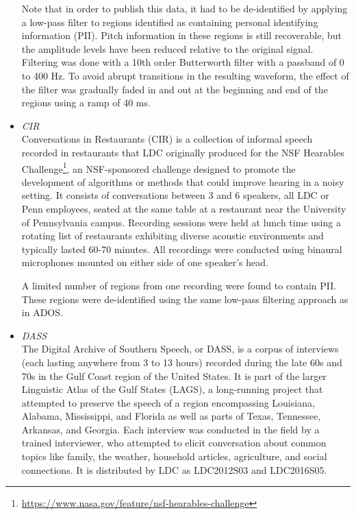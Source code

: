 \documentclass{article}
\begin{document}
\begin{appendices}
\begin{itemize}
            Note that in order to publish this data, it had to be de-identified by applying a low-pass filter to regions identified as containing personal identifying information (PII). Pitch information in these regions is still recoverable, but the amplitude levels have been reduced relative to the original signal. Filtering was done with a 10th order Butterworth filter with a passband of 0 to 400 Hz. To avoid abrupt transitions in the resulting waveform, the effect of the filter was gradually faded in and out at the beginning and end of the regions using a ramp of 40 ms.
        \item {\it CIR} \\
            Conversations in Restaurants (CIR) is a collection of informal speech recorded in restaurants that LDC originally produced for the NSF Hearables Challenge\footnote{\url{https://www.nasa.gov/feature/nsf-hearables-challenge}}, an NSF-sponsored challenge designed to promote the development of algorithms or methods that could improve hearing in a noisy setting. It consists of conversations between 3 and 6 speakers, all LDC or Penn employees, seated at the same table at a restaurant near the University of Pennsylvania campus. Recording sessions were held at lunch time using a rotating list of restaurants exhibiting diverse acoustic environments and typically lasted 60-70 minutes. All recordings were conducted using binaural microphones mounted on either side of one speaker's head. 
        
            A limited number of regions from one recording were found to contain PII. These regions were de-identified using the same low-pass filtering approach as in ADOS.
        \item {\it DASS} \\
            The Digital Archive of Southern Speech, or DASS, is a corpus of interviews (each lasting anywhere from 3 to 13 hours) recorded during the late 60s and 70s in the Gulf Coast region of the United States. It is part of the larger Linguistic Atlas of the Gulf States (LAGS), a long-running project that attempted to preserve the speech of a region encompassing Louisiana, Alabama, Mississippi, and Florida as well as parts of Texas, Tennessee, Arkansas, and Georgia. Each interview was conducted in the field by a trained interviewer, who attempted to elicit conversation about common topics like family, the weather, household articles, agriculture, and social connections. It is distributed by LDC as LDC2012S03 and LDC2016S05.
            

\end{itemize}
\end{appendices}
\end{document}
